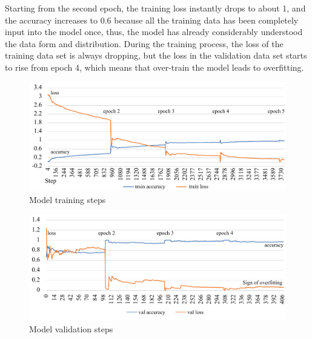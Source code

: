 Starting from the second epoch, the training loss instantly drops to about 1, and the accuracy increases to 0.6 because all the training data has been completely input into the model once, thus, the model has already considerably understood the data form and distribution.
During the training process, the loss of the training data set is always dropping, but the loss in the validation data set starts to rise from epoch 4, which means that over-train the model leads to overfitting.
\vspace*{-.5em}
\begin{figure}[!ht]
    \centering
    \includegraphics[width=.84\textwidth]{evaluation/imgs/5-train-step.pdf}
    \caption{Model training steps}
    \label{fig:5-train-step}
\end{figure}
\vspace*{-.5em}
\begin{figure}[!ht]
    \centering
    \includegraphics[width=.84\textwidth]{evaluation/imgs/5-val-steps.pdf}
    \caption{Model validation steps}
    \label{fig:5-val-steps}
\end{figure}

